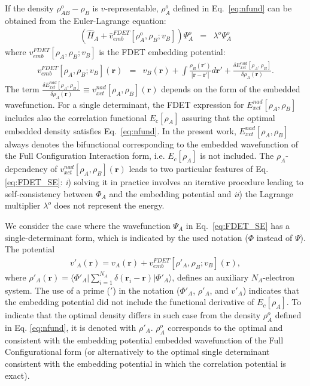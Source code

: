 \documentclass[amsmath,amssymb,preprint,aip,jcp]{revtex4-1}
\begin{document}
If the density $\rho^{o}_{AB}-\rho_{B}$ is $v$-representable, $\rho_A^{o}$ defined in Eq.~\ref{eq:nfund} can be obtained from the Euler-Lagrange equation:
\begin{eqnarray}
 \left( \hat{H}_A + \hat{v}_{emb}^{{FDET}}[\rho_A^{{o}}, \rho_B; v_B] \right) \Psi_A^{{o}} &=& \lambda^{o}\Psi_A^{{o}} \label{eq:FDET_SE} 
\end{eqnarray}
where $v_{emb}^{{FDET}}[\rho_A,\rho_B; v_B]$
is the FDET embedding potential:
\begin{eqnarray}
v_{emb}^{{FDET}}[\rho_A,\rho_B; v_B](\mathbf{r}) &=& v_B(\mathbf{r}) + \int \frac{\rho_B(\mathbf{r}')}{|\mathbf{r}-\mathbf{r}'|} d\mathbf{r}'+ \frac{\delta E_{xct}^{nad}[\rho_A,\rho_B]}{\delta\rho_A(\mathbf{r})}.
\label{eq:nFDET_embpot} 
\end{eqnarray}
The term $\frac{\delta E_{xct}^{nad}[\rho_A,\rho_B]}{\delta\rho_A(\mathbf{r})}\equiv v_{xct}^{nad}[\rho_A,\rho_B](\mathbf{r})$ depends on the form of the embedded wavefunction\cite{Wesolowski2008}.
For a single determinant, the FDET expression for $E_{xct}^{nad}[\rho_A,\rho_B]$ includes also the correlation functional $E_c[\rho_A]$ assuring that the optimal embedded density satisfies Eq.~\ref{eq:nfund}. 
In the present work, $E_{xct}^{nad}[\rho_A,\rho_B]$ always denotes the bifunctional corresponding to the embedded wavefunction of the Full Configuration Interaction form\cite{Wesolowski2008}, i.e. $E_c[\rho_A]$ is not included.
The $\rho_A$-dependency of $v_{xct}^{nad}[\rho_A,\rho_B](\mathbf{r})$ leads to two 
particular features of Eq. \ref {eq:FDET_SE}: {\it i}) solving it in practice involves an iterative procedure leading to self-consistency between $\Phi_A$ and the embedding potential
 and {\it ii}) the Lagrange multiplier $\lambda^{o}$ does not represent the energy.

We consider the case where the wavefunction $\Psi_A$ in Eq.~\ref{eq:FDET_SE} has a single-determinant form, which is indicated by the used notation ($\Phi$ instead of $\Psi$). 
The potential
\begin{eqnarray}
v'_A(\mathbf{r})=v_A(\mathbf{r})+v_{emb}^{{FDET}}[\rho'_A,\rho_B; v_B](\mathbf{r})\label{eq:def_v'},
\end{eqnarray}
where $\rho'_A(\mathbf{r})=\langle\Phi'_A\vert\sum_{i=1}^{N_{A}}\delta(\mathbf{r}_i-\mathbf{r})\vert\Phi'_A\rangle$, defines an auxiliary $N_A$-electron system. The use of a prime ($'$) in the notation ($\Phi'_A$, $\rho'_A$, and $v'_A$) indicates 
that the embedding potential did not include the functional derivative of $E_c[\rho_A]$. 
To indicate that the optimal density differs in such case from the density $\rho^{o}_A$ defined in Eq. \ref{eq:nfund}, it is denoted with $\rho'_A$.  $\rho^{o}_A$ corresponds to the optimal and consistent with the embedding potential embedded wavefunction of the Full Configurational form (or alternatively to the optimal single determinant consistent with the embedding potential in which the correlation potential is exact).  
\end{document}
